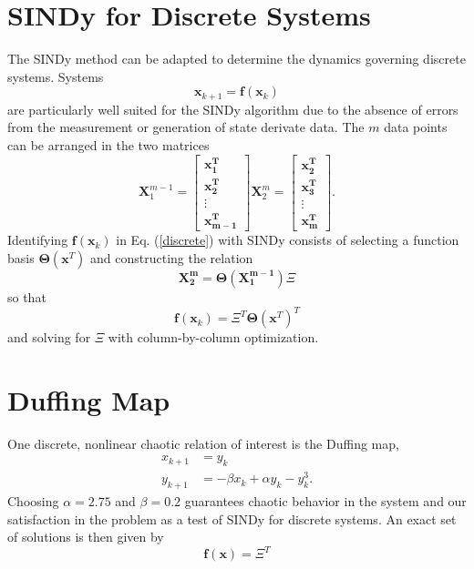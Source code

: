 \documentclass[12pt,preprintnumbers,amsmath,amssymb,titlepage]{report}
\newcommand{\refe}[1]{Eq. (\ref{#1})}
\begin{document}
\section*{SINDy for Discrete Systems}
The SINDy method can be adapted to determine the dynamics governing discrete systems. Systems 
\begin{equation} \label{discrete}
	\bm{x}_{k+1} = \bm{f}(\bm{x}_k)
\end{equation}
are particularly well suited for the SINDy algorithm due to the absence of errors from the measurement or generation of state derivate data. The $m$ data points can be arranged in the two matrices 
\begin{equation}
	\bm{X}_1^{m-1} = 
		\begin{bmatrix}
			\bm{x_1^T} \\ \bm{x_2^T} \\ \vdots \\ \bm{x_{m-1}^T}
		\end{bmatrix}
	\bm{X}_2^{m} = 
		\begin{bmatrix}
			\bm{x_2^T} \\ \bm{x_3^T} \\ \vdots \\ \bm{x_{m}^T}
		\end{bmatrix}.
\end{equation}
Identifying $\bm{f}(\bm{x}_k)$ in \refe{discrete} with SINDy consists of selecting a function basis $\bm{\Theta}(\bm{x}^T)$ and constructing the relation
\begin{equation}
	\bm{X_2^m} = \bm{\Theta}(\bm{X_1^{m-1}})\Xi
\end{equation}
so that 
\begin{equation}
	\bm{f}(\bm{x}_k) = \Xi^T \bm{\Theta}(\bm{x}^T)^T
\end{equation}
and solving for $\Xi$ with column-by-column optimization. 



\section*{Duffing Map}


One discrete, nonlinear chaotic relation of interest is the Duffing map,
\begin{align}
	x_{k+1} &= y_k \\ 
	y_{k+1} &= -\beta x_k + \alpha y_k - y_k^3.
\end{align}
Choosing $\alpha = 2.75$ and $\beta=0.2$ guarantees chaotic behavior in the system and our satisfaction in the problem as a test of SINDy for discrete systems. An exact set of solutions is then given by
\begin{equation}
	\bm{f}(\bm{x}) = \Xi^T
\end{equation}
\end{document}
